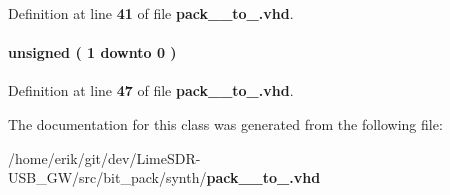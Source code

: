 Definition at line {\bf 41} of file {\bf pack\+\_\+\_\+to\+\_.\+vhd}.

\paragraph[{wr\+\_\+cnt}]{ {\bfseries \textcolor{comment}{unsigned}\textcolor{vhdlchar}{ }\textcolor{vhdlchar}{(}\textcolor{vhdlchar}{ }\textcolor{vhdlchar}{ } \textcolor{vhdldigit}{1} \textcolor{vhdlchar}{ }\textcolor{keywordflow}{downto}\textcolor{vhdlchar}{ }\textcolor{vhdlchar}{ } \textcolor{vhdldigit}{0} \textcolor{vhdlchar}{ }\textcolor{vhdlchar}{)}\textcolor{vhdlchar}{ }} \hspace{0.3cm}{\ttfamily [Signal]}}\label{classpack__48__to__64_1_1arch_ae210ddb2ea4c7747db001754329a24fc}


Definition at line {\bf 47} of file {\bf pack\+\_\+\_\+to\+\_.\+vhd}.



The documentation for this class was generated from the following file\+:\begin{DoxyCompactItemize}
\item 
/home/erik/git/dev/\+Lime\+S\+D\+R-\/\+U\+S\+B\+\_\+\+G\+W/src/bit\+\_\+pack/synth/{\bf pack\+\_\+\_\+to\+\_.\+vhd}\end{DoxyCompactItemize}
